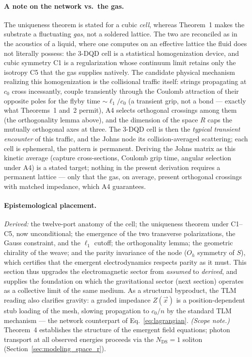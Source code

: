 \documentclass[11pt,a4paper]{article}
\theoremstyle{plain}
\theoremstyle{remark}
\newcommand{\Ncd}{\ensuremath{N_{\mathrm{DS}}}}
\begin{document}
\paragraph{A note on the network vs.\ the gas.} The uniqueness theorem is stated for a cubic \emph{cell}, whereas Theorem~1 makes the substrate a fluctuating \emph{gas}, not a soldered lattice. The two are reconciled as in the acoustics of a liquid, where one computes on an effective lattice the fluid does not literally possess: the 3-DQD cell is a statistical homogenization device, and cubic symmetry C1 is a regularization whose continuum limit retains only the isotropy C5 that the gas supplies natively. The candidate physical mechanism realizing this homogenization is the collisional traffic itself: strings propagating at $c_0$ cross incessantly, couple transiently through the Coulomb attraction of their opposite poles for the flyby time $\sim\ell_1/c_0$ (a transient grip, not a bond --- exactly what Theorems~1 and~2 permit), A4 selects orthogonal crossings among them (the orthogonality lemma above), and the dimension of the space $R$ caps the mutually orthogonal axes at three. The 3-DQD cell is then the \emph{typical transient encounter} of this traffic, and the Johns node its collision-averaged scattering; each cell is ephemeral, the pattern is permanent. Deriving the Johns matrix as this kinetic average (capture cross-sections, Coulomb grip time, angular selection under A4) is a stated target; nothing in the present derivation requires a permanent lattice --- only that the gas, on average, present orthogonal crossings with matched impedance, which A4 guarantees.

\paragraph{Epistemological placement.} \emph{Derived:} the twelve-port anatomy of the cell; the uniqueness theorem under C1--C5, now unconditional; the emergence of the two transverse polarizations, the Gauss constraint, and the $\ell_1$ cutoff; the orthogonality lemma; the geometric chirality of the weave; and the parity invariance of the node ($O_h$ symmetry of $S$), which certifies that the emergent electrodynamics respects parity as it must. This section thus upgrades the electromagnetic sector from \emph{assumed} to \emph{derived}, and supplies the foundation on which the gravitational sector (next section) operates as a collective limit of the same medium. As a structural byproduct, the TLM reading also clarifies gravity: a graded impedance $Z(\vec x)$ is a position-dependent stub loading of the mesh, slowing propagation to $c_0/n$ by the standard TLM mechanism --- the network counterpart of Eq.~\eqref{eq:lagrangian}. \emph{(Scope note.)} Theorem~4 establishes the structure of the emergent field equations; photon transport at all observed energies proceeds via the $\Ncd=1$ soliton (Section~\ref{sec:modeling_space_r}).
\end{document}
